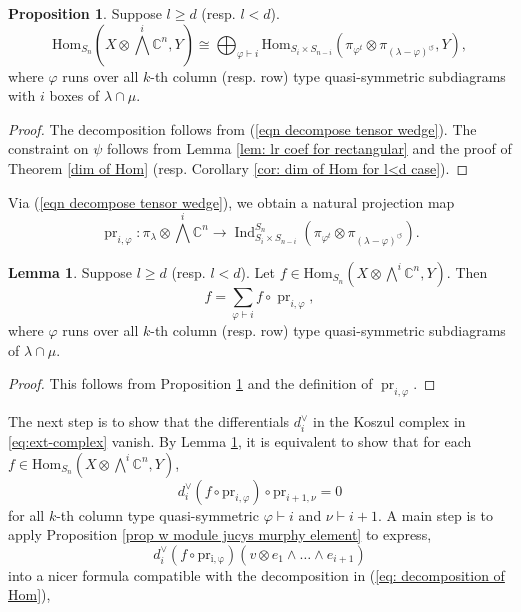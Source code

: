 \documentclass[11pt]{amsart}
\numberwithin{equation}{section}
\theoremstyle{definition}
\newtheorem{lemma}[thm]{Lemma}
\newtheorem{proposition}[thm]{Proposition}
\renewcommand{\phi}{\varphi}
\begin{document}
\begin{proposition}\label{prop: decomposition of Hom in section vanish}
Suppose  $l\geq d$ (resp.  $l< d$).
\begin{equation}\label{eq: decomposition of Hom}
    \mathrm{Hom}_{S_n}(X\otimes \bigwedge^i \mathbb C^n, Y) \cong  \bigoplus_{\phi \vdash i} \mathrm{Hom}_{S_i \times S_{n-i}}(\pi_{\phi^t}\otimes \pi_{(\lambda-\phi)^{\circlearrowleft}}, Y), 
\end{equation}   
where $\phi$ runs over all $k$-th column (resp. row) type quasi-symmetric subdiagrams with $i$ boxes of \(\lambda \cap \mu\).
\end{proposition}

\begin{proof}
The decomposition follows from (\ref{eqn decompose tensor wedge}). The constraint on \(\psi\) follows from Lemma \ref{lem: lr coef for rectangular} and the proof of Theorem \ref{dim of Hom} (resp. Corollary \ref{cor: dim of Hom for l<d case}).
\end{proof}


Via (\ref{eqn decompose tensor wedge}), we obtain a natural projection map
\begin{equation*}
       \operatorname{pr}_{i,\phi}:    \pi_{\lambda}\otimes\bigwedge^{i}\mathbb{C}^{n}
\longrightarrow
\operatorname{Ind}^{S_n}_{S_i\times S_{n-i}}
(\pi_{\phi^{t}}\otimes\pi_{(\lambda-\phi)^{\circlearrowleft}}).
   \end{equation*}


\begin{lemma}\label{lem: decomposition of f by projection}
Suppose \(l \geq d\) (resp. \(l<d\)). Let $f \in \mathrm{Hom}_{S_n}(X\otimes \bigwedge^i\mathbb C^n, Y)$. Then
    \[
    f=\sum_{\phi\vdash i}f\circ\operatorname{pr}_{i,\phi},
    \]
    where $\phi$ runs over all $k$-th column (resp. row) type quasi-symmetric subdiagrams of \(\lambda \cap \mu\).
\end{lemma}
\begin{proof}
    This follows from Proposition \ref{prop: decomposition of Hom in section vanish} and the definition of $\operatorname{pr}_{i,\phi}$.
\end{proof}


The next step is to show that the differentials $d_i^{\vee}$ in the Koszul complex in \eqref{eq:ext-complex} vanish. By Lemma \ref{lem: decomposition of f by projection}, it is equivalent to show that for each $f \in  \mathrm{Hom}_{S_n}(X\otimes \bigwedge^i \mathbb C^n, Y)$,
\begin{equation} \label{eqn decompose formula}
d_i^{\vee}(f \circ \mathrm{pr}_{i,\phi}) \circ \mathrm{pr}_{i+1, \nu} =0 
\end{equation}
for all \(k\)-th column type quasi-symmetric $\phi \vdash i$ and $\nu \vdash i+1$.  A main step is to apply Proposition \ref{prop w module jucys murphy element} to express,
\[   d_i^{\vee}(f \circ \mathrm{pr_{i,\phi}})(v\otimes e_1\wedge \ldots \wedge e_{i+1}) 
\]
into a nicer formula compatible with the decomposition in (\ref{eq: decomposition of Hom}),
\end{document}
